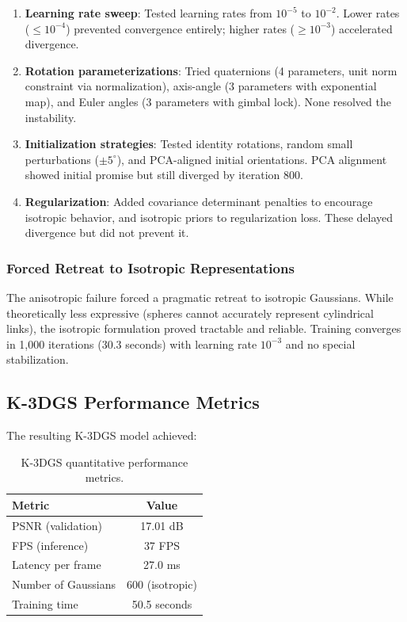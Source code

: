 \documentclass[12pt,a4paper,oneside]{report}
\begin{document}
\begin{enumerate}
    \item \textbf{Learning rate sweep}: Tested learning rates from $10^{-5}$ to $10^{-2}$. Lower rates ($\leq 10^{-4}$) prevented convergence entirely; higher rates ($\geq 10^{-3}$) accelerated divergence.
    \item \textbf{Rotation parameterizations}: Tried quaternions (4 parameters, unit norm constraint via normalization), axis-angle (3 parameters with exponential map), and Euler angles (3 parameters with gimbal lock). None resolved the instability.
    \item \textbf{Initialization strategies}: Tested identity rotations, random small perturbations ($\pm5^\circ$), and PCA-aligned initial orientations. PCA alignment showed initial promise but still diverged by iteration 800.
    \item \textbf{Regularization}: Added covariance determinant penalties to encourage isotropic behavior, and isotropic priors to regularization loss. These delayed divergence but did not prevent it.
\end{enumerate}

\subsubsection{Forced Retreat to Isotropic Representations}

The anisotropic failure forced a pragmatic retreat to isotropic Gaussians. While theoretically less expressive (spheres cannot accurately represent cylindrical links), the isotropic formulation proved tractable and reliable. Training converges in 1,000 iterations (30.3 seconds) with learning rate $10^{-3}$ and no special stabilization.

\subsection{K-3DGS Performance Metrics}

The resulting K-3DGS model achieved:

\begin{table}[H]
\centering
\caption{K-3DGS quantitative performance metrics.}
\label{tab:k3dgs_performance}
\begin{tabular}{lc}
\toprule
Metric & Value \\
\midrule
PSNR (validation) & 17.01 dB \\
FPS (inference) & 37 FPS \\
Latency per frame & 27.0 ms \\
Number of Gaussians & 600 (isotropic) \\
Training time & 50.5 seconds \\
\bottomrule
\end{tabular}
\end{table}
\end{document}
